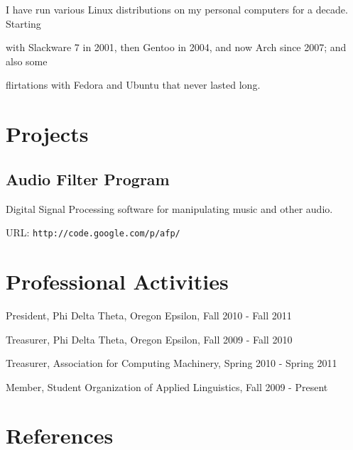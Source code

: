 \documentclass[10pt,letterpaper]{article}
\renewenvironment{itemize}{
  \begin{list}{}{
    \setlength{\leftmargin}{1.5em}
    \setlength{\itemsep}{0em}
    \setlength{\parskip}{0pt}
    \setlength{\parsep}{0em}
  }
}{
  \end{list}
}
\begin{document}
\begin{itemize}

    \item I have run various Linux distributions on my personal computers for a decade.  Starting
    \item with Slackware 7 in 2001, then Gentoo in 2004, and now Arch since 2007; and also some
    \item flirtations with Fedora and Ubuntu that never lasted long.

\end{itemize}

\section*{Projects}

\subsection*{Audio Filter Program}

\begin{itemize}
	
	\item Digital Signal Processing software for manipulating music and other audio.
	\item URL: \texttt{http://code.google.com/p/afp/}
	
\end{itemize}

\section*{Professional Activities}

\begin{itemize}

	\item President, Phi Delta Theta, Oregon Epsilon, Fall 2010 - Fall 2011
	\item Treasurer, Phi Delta Theta, Oregon Epsilon, Fall 2009 - Fall 2010
	\item Treasurer, Association for Computing Machinery, Spring 2010 - Spring 2011
	\item Member, Student Organization of Applied Linguistics, Fall 2009 - Present

\end{itemize}

\pagebreak
\section*{References}
\end{document}
